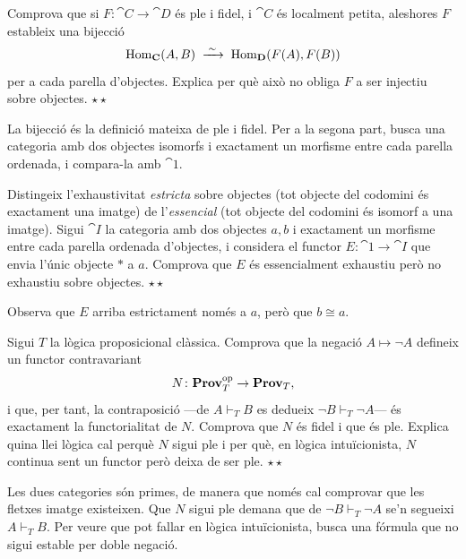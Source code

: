 \begin{exercici}
Comprova que si $F\colon\cat{C}\to\cat{D}$ és ple i fidel, i $\cat{C}$ és localment petita, aleshores $F$ estableix una bijecció
\[
\operatorname{Hom}_{\mathbf{C}}(A,B)\;\xrightarrow{\;\sim\;}\;\operatorname{Hom}_{\mathbf{D}}(F(A),F(B))
\]
per a cada parella d'objectes. Explica per què això no obliga $F$ a ser injectiu sobre objectes. \hfill{\normalfont$\star\star$}
\begin{indicacio}
La bijecció és la definició mateixa de ple i fidel. Per a la segona part, busca una categoria amb dos objectes isomorfs i exactament un morfisme entre cada parella ordenada, i compara-la amb $\cat{1}$.
\end{indicacio}
\end{exercici}

\begin{exercici}
Distingeix l'exhaustivitat \emph{estricta} sobre objectes (tot objecte del codomini és exactament una imatge) de l'\emph{essencial} (tot objecte del codomini és isomorf a una imatge). Sigui $\cat{I}$ la categoria amb dos objectes $a,b$ i exactament un morfisme entre cada parella ordenada d'objectes, i considera el functor $E\colon\cat{1}\to\cat{I}$ que envia l'únic objecte $\ast$ a $a$. Comprova que $E$ és essencialment exhaustiu però no exhaustiu sobre objectes. \hfill{\normalfont$\star\star$}
\begin{indicacio}
Observa que $E$ arriba estrictament només a $a$, però que $b\cong a$.
\end{indicacio}
\end{exercici}

\begin{exercici}
Sigui $T$ la lògica proposicional clàssica. Comprova que la negació $A\mapsto\neg A$ defineix un functor contravariant
\[
N\colon\mathbf{Prov}_T^{\mathrm{op}}\to\mathbf{Prov}_T,
\]
i que, per tant, la contraposició ---de $A\vdash_T B$ es dedueix $\neg B\vdash_T\neg A$--- és exactament la functorialitat de $N$. Comprova que $N$ és fidel i que és ple. Explica quina llei lògica cal perquè $N$ sigui ple i per què, en lògica intuïcionista, $N$ continua sent un functor però deixa de ser ple. \hfill{\normalfont$\star\star$}
\begin{indicacio}
Les dues categories són primes, de manera que només cal comprovar que les fletxes imatge existeixen. Que $N$ sigui ple demana que de $\neg B\vdash_T\neg A$ se'n segueixi $A\vdash_T B$. Per veure que pot fallar en lògica intuïcionista, busca una fórmula que no sigui estable per doble negació.
\end{indicacio}
\end{exercici}
